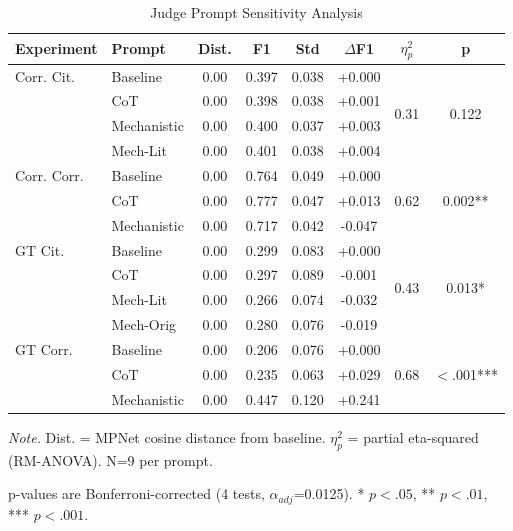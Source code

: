 \begin{table}[H]
\centering
\footnotesize
\caption{Judge Prompt Sensitivity Analysis}
\label{tab:prompt_sensitivity}
\begin{threeparttable}
\begin{tabular}{@{}llcccccc@{}}
\toprule
\textbf{Experiment} & \textbf{Prompt} & \textbf{Dist.} & \textbf{F1} & \textbf{Std} & \textbf{$\Delta$F1} & \textbf{$\eta^2_p$} & \textbf{p} \\
\midrule
Corr. Cit. & Baseline & 0.00 & 0.397 & 0.038 & +0.000 & \multirow{4}{*}{0.31} & \multirow{4}{*}{0.122} \\
 & CoT & 0.00 & 0.398 & 0.038 & +0.001 &  &  \\
 & Mechanistic & 0.00 & 0.400 & 0.037 & +0.003 &  &  \\
 & Mech-Lit & 0.00 & 0.401 & 0.038 & +0.004 &  &  \\
\midrule
Corr. Corr. & Baseline & 0.00 & 0.764 & 0.049 & +0.000 & \multirow{3}{*}{0.62} & \multirow{3}{*}{0.002**} \\
 & CoT & 0.00 & 0.777 & 0.047 & +0.013 &  &  \\
 & Mechanistic & 0.00 & 0.717 & 0.042 & -0.047 &  &  \\
\midrule
GT Cit. & Baseline & 0.00 & 0.299 & 0.083 & +0.000 & \multirow{4}{*}{0.43} & \multirow{4}{*}{0.013*} \\
 & CoT & 0.00 & 0.297 & 0.089 & -0.001 &  &  \\
 & Mech-Lit & 0.00 & 0.266 & 0.074 & -0.032 &  &  \\
 & Mech-Orig & 0.00 & 0.280 & 0.076 & -0.019 &  &  \\
\midrule
GT Corr. & Baseline & 0.00 & 0.206 & 0.076 & +0.000 & \multirow{3}{*}{0.68} & \multirow{3}{*}{$<$.001***} \\
 & CoT & 0.00 & 0.235 & 0.063 & +0.029 &  &  \\
 & Mechanistic & 0.00 & 0.447 & 0.120 & +0.241 &  &  \\
\bottomrule
\end{tabular}
\begin{tablenotes}
\scriptsize
\item \textit{Note.} Dist. = MPNet cosine distance from baseline. $\eta^2_p$ = partial eta-squared (RM-ANOVA). N=9 per prompt.
\item p-values are Bonferroni-corrected (4 tests, $\alpha_{adj}$=0.0125). * $p<.05$, ** $p<.01$, *** $p<.001$.
\end{tablenotes}
\end{threeparttable}
\end{table}